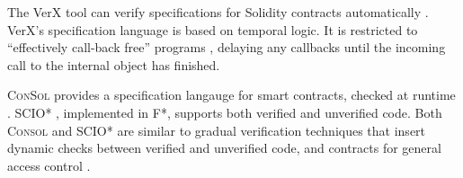 The VerX tool can verify
specifications for Solidity contracts automatically \cite{VerX}.
VerX's specification language is based on temporal logic.
It %
is restricted to ``effectively call-back free'' programs
\cite{Grossman,relaxed-callbacks-ToDES},
delaying any callbacks until the
incoming call to the internal object has finished.
 
\textsc{ConSol} \cite{consolidating-pldi2024}
provides a specification langauge for smart contracts,
checked at runtime \cite{FinFel01}.
SCIO* \cite{secure-io-fstar-popl2024}, implemented in
F*, supports both
verified and unverified code.
Both \textsc{Consol} and SCIO* are 
similar to gradual verification techniques 
\cite{gradual-verification-popl2024,Cok2022} that
insert dynamic checks between verified and unverified code,
and contracts for general access control 
\cite{DPCC14,AuthContract,cedar-oopsla2024}.




%


